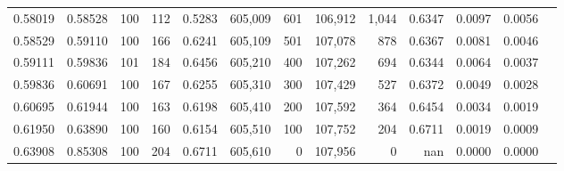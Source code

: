 \begin{tabular}{rrrrrrrrrrrrr}
0.58019 & 0.58528 &   100 & 112 &                                     0.5283 & 605,009 &     601 & 106,912 &   1,044 & 0.6347 & 0.0097 & 0.0056 \\
0.58529 & 0.59110 &   100 & 166 &                                     0.6241 & 605,109 &     501 & 107,078 &     878 & 0.6367 & 0.0081 & 0.0046 \\
0.59111 & 0.59836 &   101 & 184 &                                     0.6456 & 605,210 &     400 & 107,262 &     694 & 0.6344 & 0.0064 & 0.0037 \\
0.59836 & 0.60691 &   100 & 167 &                                     0.6255 & 605,310 &     300 & 107,429 &     527 & 0.6372 & 0.0049 & 0.0028 \\
0.60695 & 0.61944 &   100 & 163 &                                     0.6198 & 605,410 &     200 & 107,592 &     364 & 0.6454 & 0.0034 & 0.0019 \\
0.61950 & 0.63890 &   100 & 160 &                                     0.6154 & 605,510 &     100 & 107,752 &     204 & 0.6711 & 0.0019 & 0.0009 \\
0.63908 & 0.85308 &   100 & 204 &                                     0.6711 & 605,610 &       0 & 107,956 &       0 &    nan & 0.0000 & 0.0000 \\
\bottomrule
\end{tabular}
